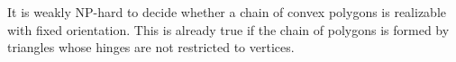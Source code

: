 \documentclass[runningheads]{article}
\begin{document}
\begin{theorem}\label{thm:path2}
It is weakly NP-hard to decide whether a chain of convex polygons is realizable with fixed orientation. This is already true if the chain of polygons is formed by triangles whose hinges are not restricted to vertices.
\end{theorem}
%
%
%
\end{document}
